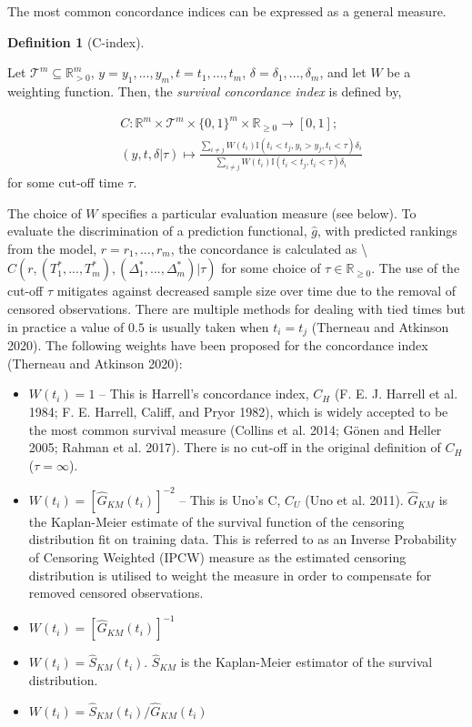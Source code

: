 \documentclass[
  letterpaper,
]{scrbook}
\providecommand{\tightlist}{%
  \setlength{\itemsep}{0pt}\setlength{\parskip}{0pt}}\usepackage{longtable,booktabs,array}
\theoremstyle{plain}
\theoremstyle{definition}
\newtheorem{definition}{Definition}[chapter]
\theoremstyle{remark}
\begin{document}
The most common concordance indices can be expressed as a general
measure.

\leavevmode{}%
\begin{definition}[C-index]\label{def-cindex}

Let \(\mathcal{T}^m \subseteq \mathbb{R}_{>0}^m\),
\(y = y_1,...,y_m, t = t_1,...,t_m\),
\(\delta = \delta_1,...,\delta_m\), and let \(W\) be a weighting
function. Then, the \emph{survival concordance index} is defined by,

\[
\begin{split}
&C: \mathbb{R}^m \times \mathcal{T}^m \times \{0,1\}^m \times \mathbb{R}_{\geq 0}\rightarrow [0,1]; \\
&(y, t, \delta|\tau) \mapsto \frac{\sum_{i\neq j} W(t_i)\mathbb{I}(t_i < t_j, y_i > y_j, t_i < \tau)\delta_i}{\sum_{i\neq j}W(t_i)\mathbb{I}(t_i < t_j, t_i < \tau)\delta_i}
\end{split}
\] for some cut-off time \(\tau\).

\end{definition}

The choice of \(W\) specifies a particular evaluation measure (see
below). To evaluate the discrimination of a prediction functional,
\(\hat{g}\), with predicted rankings from the model,
\(r = r_1,...,r_m\), the concordance is calculated as
\textbackslash{}\(C(r, (T^*_1,...,T^*_m), (\Delta^*_1,...,\Delta^*_m)|\tau)\)
for some choice of \(\tau \in \mathbb{R}_{\geq 0}\). The use of the
cut-off \(\tau\) mitigates against decreased sample size over time due
to the removal of censored observations. There are multiple methods for
dealing with tied times but in practice a value of \(0.5\) is usually
taken when \(t_i = t_j\) (Therneau and Atkinson 2020). The following
weights have been proposed for the concordance index (Therneau and
Atkinson 2020):

\begin{itemize}
\tightlist
\item
  \(W(t_i) = 1\) -- This is Harrell's concordance index, \(C_H\) (F. E.
  J. Harrell et al. 1984; F. E. Harrell, Califf, and Pryor 1982), which
  is widely accepted to be the most common survival measure (Collins et
  al. 2014; Gönen and Heller 2005; Rahman et al. 2017). There is no
  cut-off in the original definition of \(C_H\) (\(\tau = \infty\)).
\item
  \(W(t_i) = [\hat{G}_{KM}(t_i)]^{-2}\) -- This is Uno's C, \(C_U\) (Uno
  et al. 2011). \(\hat{G}_{KM}\) is the Kaplan-Meier estimate of the
  survival function of the censoring distribution fit on training data.
  This is referred to as an Inverse Probability of Censoring Weighted
  (IPCW) measure as the estimated censoring distribution is utilised to
  weight the measure in order to compensate for removed censored
  observations.
\item
  \(W(t_i) = [\hat{G}_{KM}(t_i)]^{-1}\)
\item
  \(W(t_i) = \hat{S}_{KM}(t_i)\). \(\hat{S}_{KM}\) is the Kaplan-Meier
  estimator of the survival distribution.
\item
  \(W(t_i) = \hat{S}_{KM}(t_i)/\hat{G}_{KM}(t_i)\)
\end{itemize}
\end{document}
